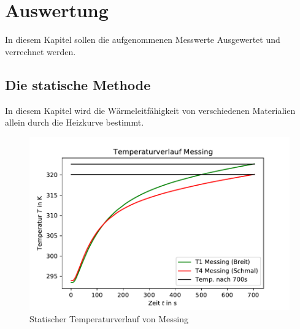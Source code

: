 \section{Auswertung}
In diesem Kapitel sollen die aufgenommenen Messwerte Ausgewertet und verrechnet werden.
\subsection{Die statische Methode}
\label{sec:auswertung1}
In diesem Kapitel wird die Wärmeleitfähigkeit von verschiedenen Materialien allein durch die Heizkurve bestimmt.

\begin{figure}
    \centering
    \includegraphics{statmessing.pdf}
    \caption{Statischer Temperaturverlauf von Messing}
    \label{fig:statmess}
  \end{figure}


